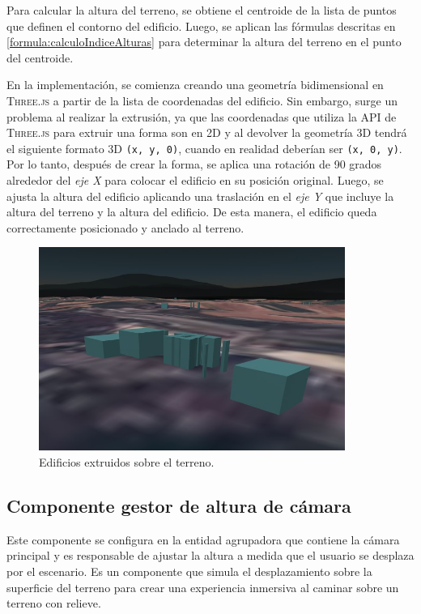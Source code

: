 \documentclass[a4paper, 11pt]{book}
\begin{document}
Para calcular la altura del terreno, se obtiene el \gls{centroide} de la lista de puntos que definen el contorno del edificio. Luego, se aplican las fórmulas descritas en \ref{formula:calculoIndiceAlturas} para determinar la altura del terreno en el punto del centroide.

En la implementación, se comienza creando una geometría bidimensional en \textsc{Three.js} a partir de la lista de coordenadas del edificio. Sin embargo, surge un problema al realizar la extrusión, ya que las coordenadas que utiliza la \textsc{API} de \textsc{Three.js} para extruir una forma son en \textsc{2D} y al devolver la geometría \textsc{3D} tendrá el siguiente formato \textsc{3D} \texttt{(x, y, 0)}, cuando en realidad deberían ser \texttt{(x, 0, y)}. 
Por lo tanto, después de crear la forma, se aplica una rotación de 90 grados alrededor del \emph{eje X} para colocar el edificio en su posición original. Luego, se ajusta la altura del edificio aplicando una traslación en el \emph{eje Y} que incluye la altura del terreno y la altura del edificio. De esta manera, el edificio queda correctamente posicionado y anclado al terreno.

\begin{figure}[h]
  \centering
  \includegraphics[width=10cm, keepaspectratio]{img/buildings.jpg}
  \caption{Edificios extruidos sobre el terreno.}
  \label{fig:buildings}
\end{figure}
\subsection{Componente gestor de altura de cámara}
\label{subsec:cameraHeight}
Este componente se configura en la entidad agrupadora que contiene la cámara principal y es responsable de ajustar la altura a medida que el usuario se desplaza por el escenario. Es un componente que simula el desplazamiento sobre la superficie del terreno para crear una experiencia inmersiva al caminar sobre un terreno con relieve.
\end{document}
